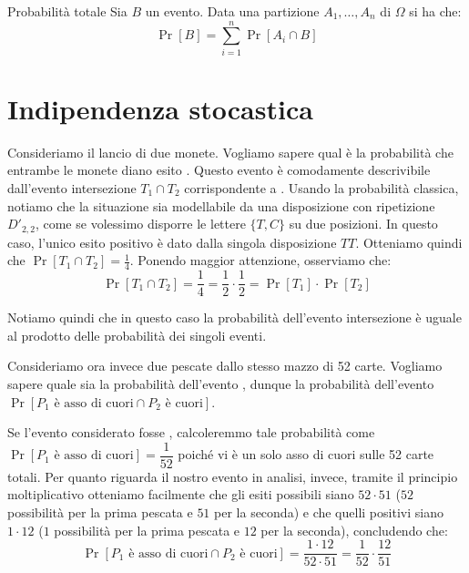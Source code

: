 \documentclass[a4paper, 12pt]{report}
\begin{document}
    \begin{framedprop}{Probabilità totale}
        Sia $B$ un evento. Data una partizione $A_1, \ldots, A_n$ di $\Omega$ si ha che:
        \[\Pr[B] = \sum_{i = 1}^n \Pr[A_i \cap B]\]
    \end{framedprop}

    \section{Indipendenza stocastica}
   
    Consideriamo il lancio di due monete. Vogliamo sapere qual è la probabilità che entrambe le monete diano esito . Questo evento è comodamente descrivibile dall'evento intersezione $T_1 \cap T_2$ corrispondente a . Usando la probabilità classica, notiamo che la situazione sia modellabile da una disposizione con ripetizione $D'_{2,2}$, come se volessimo disporre le lettere $\{T,C\}$ su due posizioni. In questo caso, l'unico esito positivo è dato dalla singola disposizione $TT$. Otteniamo quindi che $\Pr[T_1 \cap T_2] = \frac{1}{4}$. Ponendo maggior attenzione, osserviamo che:
    \[\Pr[T_1 \cap T_2] = \frac{1}{4} = \frac{1}{2} \cdot \frac{1}{2} = \Pr[T_1] \cdot \Pr[T_2]\]

    Notiamo quindi che in questo caso la probabilità dell'evento intersezione è uguale al prodotto delle probabilità dei singoli eventi.

    Consideriamo ora invece due pescate dallo stesso mazzo di 52 carte. Vogliamo sapere quale sia la probabilità dell'evento , dunque la probabilità dell'evento $\Pr[P_1 \text{ è asso di cuori} \cap P_2 \text{ è cuori}]$.
    
    Se l'evento considerato fosse , calcoleremmo tale probabilità come $\Pr[P_1 \text{ è asso di cuori}] = \dfrac{1}{52}$ poiché vi è un solo asso di cuori sulle 52 carte totali. Per quanto riguarda il nostro evento in analisi, invece, tramite il principio moltiplicativo otteniamo facilmente che gli esiti possibili siano $52 \cdot 51$ ($52$ possibilità per la prima pescata e $51$ per la seconda) e che quelli positivi siano $1 \cdot 12$ ($1$ possibilità per la prima pescata e $12$ per la seconda), concludendo che:
    \[\Pr[P_1\text{ è asso di cuori} \cap P_2 \text{ è cuori}] = \frac{1 \cdot 12}{52 \cdot 51} = \frac{1}{52} \cdot \frac{12}{51}\]
\end{document}
